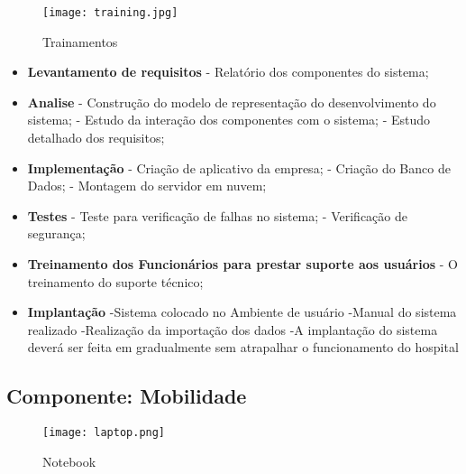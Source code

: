 \begin{figure}[H]
       \begin{center}
              \texttt{[image: training.jpg]}
              \caption{Trainamentos} \label{sistema}
       \end{center}
\end{figure}


\begin{itemize}
       \item \textbf{Levantamento de requisitos}
         \subitem - Relatório dos componentes do sistema;

        \item\textbf{ Analise}
         \subitem - Construção do modelo de representação do desenvolvimento do sistema;
          \subitem - Estudo da interação dos componentes com o sistema;
           \subitem  - Estudo detalhado dos requisitos;

         \item \textbf{Implementação}
          \subitem - Criação de aplicativo da empresa;
           \subitem  - Criação do Banco de Dados;
            \subitem - Montagem do servidor em nuvem;

          \item \textbf{Testes}
         \subitem - Teste para verificação de falhas no sistema;
          \subitem - Verificação de segurança;

           \item \textbf{Treinamento dos Funcionários para prestar suporte aos usuários}
         \subitem - O treinamento do suporte técnico;

          \item \textbf{Implantação}
         \subitem -Sistema colocado no Ambiente de usuário
          \subitem -Manual do sistema realizado
         \subitem -Realização da importação dos dados
          \subitem -A implantação do sistema deverá ser feita em gradualmente sem atrapalhar o funcionamento do hospital
         \end{itemize}

\subsection{Componente: Mobilidade}

\begin{figure}[H]
       \begin{center}
              \texttt{[image: laptop.png]}
              \caption{Notebook} \label{sistema}
       \end{center}
\end{figure}

